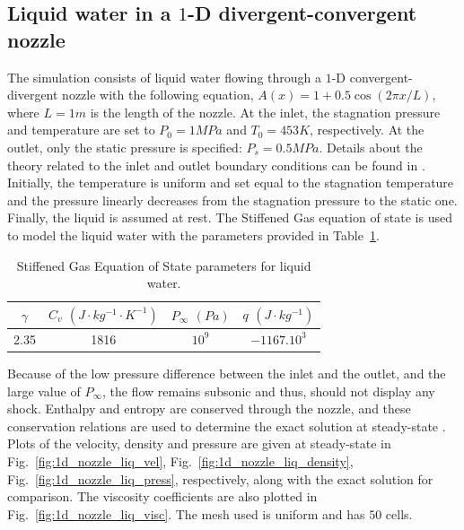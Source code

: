 \documentclass[preprint,10pt]{elsarticle}
\newcommand{\fig}[1]{Fig.~\ref{#1}}                      %
\newcommand{\tbl}[1]{Table~\ref{#1}}                     %
\begin{document}
\subsection{Liquid water in a $1$-D divergent-convergent nozzle} \label{sec:liquid_nozzle}
The simulation consists of liquid water flowing through a $1$-D convergent-divergent nozzle with the following equation, $A(x) = 1 + 0.5 \cos(2 \pi x / L)$, where $L=1m$ is the length of the nozzle. At the inlet,  the stagnation pressure and temperature are set to $P_0 = 1 MPa$ and $T_0 = 453 K$, respectively. At the outlet, only the static pressure is specified: $P_s = 0.5MPa$. Details about the theory related to the inlet and outlet boundary conditions can be found in \cite{SEM}. Initially, the temperature is uniform and set equal to the stagnation temperature and the pressure linearly decreases from the stagnation pressure to the static one. Finally, the liquid is assumed at rest. The Stiffened Gas equation of state is used to model the liquid water with the parameters provided in \tbl{tbl:stff_gas_eos_liq}.
\begin{table}[H]
\begin{center}
 \caption{\label{tbl:stff_gas_eos_liq} Stiffened Gas Equation of State parameters for liquid water.}
 \begin{tabular}{|c|c|c|c|}
 \hline
$\gamma$ & $C_v$ $(J\cdot kg^{-1} \cdot K^{-1})$ & $P_{\infty}$ $(Pa)$ & $q$ $(J \cdot kg^{-1})$ \\
 \hline
2.35 & 1816 & $10^9$ & $-1167.10^3$   \\
  \hline
\end{tabular}
\end{center}
\end{table}
Because of the low pressure difference between the inlet and the outlet, and the large value of $P_{\infty}$, the flow remains subsonic and thus, should not display any shock. Enthalpy and entropy are conserved through the nozzle, and these conservation relations are used to determine the exact solution at steady-state \cite{nozzle_exact}.
Plots of the velocity, density and pressure are given at steady-state in \fig{fig:1d_nozzle_liq_vel}, \fig{fig:1d_nozzle_liq_density}, \fig{fig:1d_nozzle_liq_press}, respectively, along with the exact solution for comparison. The viscosity coefficients are also plotted in \fig{fig:1d_nozzle_liq_visc}. The mesh used is uniform and has $50$ cells.
\end{document}
